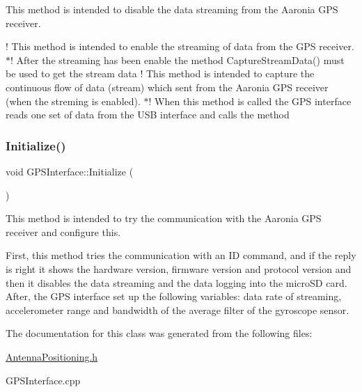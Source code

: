 This method is intended to disable the data streaming from the Aaronia G\+PS receiver. 

! This method is intended to enable the streaming of data from the G\+PS receiver. $\ast$! After the streaming has been enable the method Capture\+Stream\+Data() must be used to get the stream data ! This method is intended to capture the continuous flow of data (stream) which sent from the Aaronia G\+PS receiver (when the streming is enabled). $\ast$! When this method is called the G\+PS interface reads one set of data from the U\+SB interface and calls the method \mbox{\label{classGPSInterface_ac4a2712c98235f5ca2d826525180840b}} 
\subsubsection{\texorpdfstring{Initialize()}{Initialize()}}
{\footnotesize\ttfamily void G\+P\+S\+Interface\+::\+Initialize (\begin{DoxyParamCaption}{ }\end{DoxyParamCaption})}



This method is intended to try the communication with the Aaronia G\+PS receiver and configure this. 

First, this method tries the communication with an ID command, and if the reply is right it shows the hardware version, firmware version and protocol version and then it disables the data streaming and the data logging into the micro\+SD card. After, the G\+PS interface set up the following variables\+: data rate of streaming, accelerometer range and bandwidth of the average filter of the gyroscope sensor. 

The documentation for this class was generated from the following files\+:\begin{DoxyCompactItemize}
\item 
\hyperlink{AntennaPositioning_8h}{Antenna\+Positioning.\+h}\item 
G\+P\+S\+Interface.\+cpp\end{DoxyCompactItemize}
